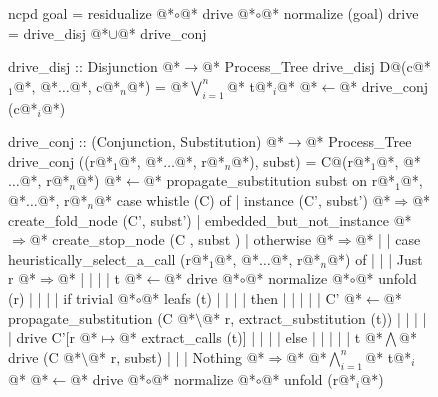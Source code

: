 \documentclass[12pt,a4paper]{report}
\begin{document}
\thispagestyle{empty}
\begin{figure}[h]
\begin{PseudoCode}[moredelim={[is][stringstyle]{@@}{@@}},
  moredelim={[is][\color{dkgreen}\bfseries]{@!}{@!}},
  moredelim={[is][\color{red}\bfseries]{!!}{!!}}]
ncpd goal = residualize @*$\circ$@* drive @*$\circ$@* normalize (goal)
drive     = drive_disj @*$\cup$@* drive_conj

drive_disj :: Disjunction @*$\to$@* Process_Tree
drive_disj D@(c@*$_1$@*, @*$\dots$@*, c@*$_n$@*) = @*$\bigvee_{i=1}^n$@* t@*$_i$@* @*$\leftarrow$@* drive_conj (c@*$_i$@*)

drive_conj :: (Conjunction, Substitution) @*$\to$@* Process_Tree
drive_conj ((r@*$_1$@*, @*$\dots$@*, r@*$_n$@*), subst) =
  C@(r@*$_1$@*, @*$\dots$@*, r@*$_n$@*) @*$\leftarrow$@* propagate_substitution subst on r@*$_1$@*, @*$\dots$@*, r@*$_n$@*
  case whistle (C) of
  | instance (C', subst')     @*$\Rightarrow$@* create_fold_node (C', subst')
  | embedded_but_not_instance @*$\Rightarrow$@* create_stop_node (C , subst )
  | otherwise @*$\Rightarrow$@*
  | | case heuristically_select_a_call (r@*$_1$@*, @*$\dots$@*, r@*$_n$@*) of
  | | | Just r @*$\Rightarrow$@*
  | | | | t @*$\leftarrow$@* drive @*$\circ$@* normalize @*$\circ$@* unfold (r)
  | | | | if trivial @*$\circ$@* leafs (t)
  | | | | then
  | | | | | C' @*$\leftarrow$@* propagate_substitution (C @*$\setminus$@* r, extract_substitution (t))
  | | | | | drive C'[r @*$\mapsto$@* extract_calls (t)]
  | | | | else
  | | | | | t @*$\bigwedge$@* drive (C @*$\setminus$@* r, subst)
  | | | Nothing @*$\Rightarrow$@* @*$\bigwedge_{i=1}^n$@* t@*$_i$@* @*$\leftarrow$@* drive @*$\circ$@* normalize @*$\circ$@* unfold (r@*$_i$@*)
\end{PseudoCode}
\end{figure}
\end{document}

